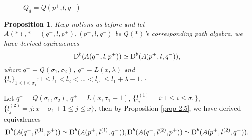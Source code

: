 \documentclass[a4paper, reqno]{amsart}
\newtheorem{prop}[thm]{Proposition}
\theoremstyle{definition}
\theoremstyle{remark}
\numberwithin{equation}{section}
\begin{document}
\begin{figure}
{
   
   }
    
    \caption{$Q_d = Q(p^{+},l,q^{-})$}
   
\end{figure}
\begin{prop}
     Keep notions as before and let $A(*), * =(q^{-},l,p^{+}), (p^{+},l,q^{-})$ be $Q(*)$'s corresponding path algebra, we have derived equivalences 
     $$ 
    \textup{D}^{b}( A(q^{-},l,p^{+})) \simeq \textup{D}^{b}(A(p^{+},l,q^{-})), 
     $$
     where $q^{-} = Q(\sigma_1,\sigma_2) $, $q^{+} = L(x,\lambda)$ and $\{l_i\}_{1\leq i\leq \sigma_1}: 1\leq l_1 <l_2<\dots <l_{\sigma_1}\leq l_1+\lambda -1$. \hfill $\square $
\end{prop} 

Let $ q^{-} = Q(\sigma_1,\sigma_2)$, $q^{+}= L(x,\sigma_1+1)$, $\{l_i^{(1)}=i:1\leq i\leq \sigma_1\}$, $\{l_j^{(2)}=j:x-\sigma_1+1\leq j\leq x\}$, then by Proposition \ref{prop 2.5}, we have derived equivalences 
$$
 \textup{D}^{b}(A(q^{-},l^{(1)},p^{+})) \simeq \textup{D}^{b}(A(p^{+},l^{(1)},q^{-})), 
 \textup{D}^{b}(A(q^{-},l^{(2)},p^{+}) )\simeq \textup{D}^{b}(A(p^{+},l^{(2)},q^{-})).
$$
\end{document}
